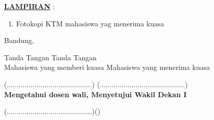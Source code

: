 \documentclass[12pt]{letter}
\begin{document}
{\textbf{\underline{LAMPIRAN}} :
\begin{enumerate}
	\item Fotokopi KTM mahasiswa yag menerima kuasa
\end{enumerate}
		
		\begin{flushright}
			Bandung, 			
		\end{flushright}
Tanda Tangan \hspace{7.3cm}Tanda Tangan \\
Mahasiswa yang memberi kuasa \hspace{4cm} Mahasiswa yang menerima kuasa \\
\begin{flushright}
		\end{flushright}
			\vspace{1cm}
			
	(...........................................)\hspace{4.6cm} (...........................................)\\
	
	\textbf{Mengetahui dosen wali, \hspace{4.8cm} Menyetujui Wakil Dekan I}
	\vspace{2cm}
			
	(...........................................)\hspace{4.8cm}()
	\thispagestyle{empty}
		\newpage

}
 
\end{document}
